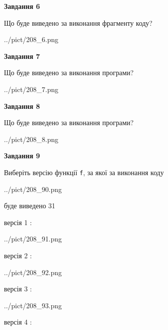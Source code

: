 \documentclass[12pt, ukrainian]{article}
\def\code#1{\Verb!#1!}
\begin{document}
{\begin {large}
{\begin {center}\textbf{Завдання 6}\end {center}}

Що буде виведено за виконання фрагменту коду?\par
\begin{center}
	{../pict/208_6.png}
\end{center}
\newpage

{\begin {center}\textbf{Завдання 7}\end {center}}

Що буде виведено за виконання програми?\par
\begin{center}
	{../pict/208_7.png}
\end{center}
\newpage

{\begin {center}\textbf{Завдання 8}\end {center}}

Що буде виведено за виконання програми?\par
\begin{center}
	{../pict/208_8.png}
\end{center}
\newpage

{\begin {center}\textbf{Завдання 9}\end {center}}

Виберіть версію функції \code{f}, за якої за виконання коду
\begin{center}
	{../pict/208_90.png}
\end{center}
буде виведено 31

\vspace{5mm}
версія 1 :

\begin{center}
	{../pict/208_91.png}
\end{center}
версія 2 :

\begin{center}
	{../pict/208_92.png}
\end{center}
версія 3 :

\begin{center}
	{../pict/208_93.png}
\end{center}
версія 4 :


\end{large}}
\end{document}
